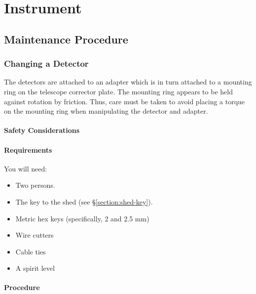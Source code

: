
\chapter{Instrument}

\section{Maintenance Procedure}

\subsection{Changing a Detector}

The detectors are attached to an adapter which is in turn attached to a mounting ring on the telescope corrector plate. The mounting ring appears to be held against rotation by friction. Thus, care must be taken to avoid placing a torque on the mounting ring when manipulating the detector and adapter.

\subsubsection{Safety Considerations}



\subsubsection{Requirements}

You will need:

\begin{itemize}
\item Two persons.
\item The key to the shed (see \S\ref{section:shed-key}).
\item Metric hex keys (specifically, 2 and 2.5 mm)
\item Wire cutters
\item Cable ties
\item A spirit level
\end{itemize}

\subsubsection{Procedure}

